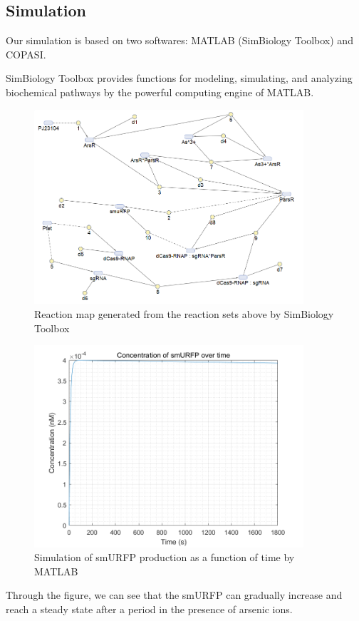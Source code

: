 \subsection{Simulation }
Our simulation is based on two softwares: MATLAB (SimBiology Toolbox) and COPASI.

SimBiology Toolbox provides functions for modeling, simulating, and analyzing biochemical pathways by the powerful computing engine of MATLAB.

\begin{figure}[h]
	\centering
	\includegraphics[width=10cm]{screenshot003}	
	\caption{Reaction map generated from the reaction sets above by SimBiology Toolbox}
\end{figure}



\begin{figure}[H]
	\centering
	\includegraphics[width=10cm]{11}
	\caption{Simulation of smURFP production as a function of time by MATLAB}
\end{figure}

Through the figure, we can see that the smURFP can gradually increase and reach a steady state after a period in the presence of arsenic ions.

